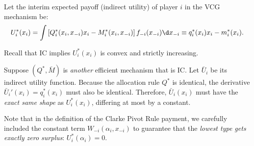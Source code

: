 Let the interim expected payoff (indirect utility) of player $i$ in the VCG mechanism be:
\[
U_i^*(x_i) = \int \left[ Q_i^*(x_i,x_{-i})x_i - M_i^*(x_i,x_{-i}) \right] f_{-i}(x_{-i})\d x_{-i} \equiv q_i^*(x_i)x_i - m_i^*(x_i).
\]

Recall that IC implies $U_i^*(x_i)$ is convex and strictly increasing. 

Suppose $(Q^*, \bar{M})$ is \textit{another} efficient mechanism that is IC. Let $\bar{U}_i$ be its indirect utility function. Because the allocation rule $Q^*$ is identical, the derivative $\bar{U}_i'(x_i) = q_i^*(x_i)$ must also be identical. Therefore, $\bar{U}_i(x_i)$ must have the \textit{exact same shape} as $U_i^*(x_i)$, differing at most by a constant.

Note that in the definition of the Clarke Pivot Rule payment, we carefully included the constant term $W_{-i}(\alpha_i, x_{-i})$ to guarantee that the \textit{lowest type gets exactly zero surplus}: $U_i^*(\alpha_i) = 0$.

